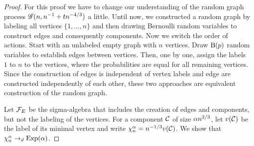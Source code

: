 \begin{proof}
	For this proof we have to change our understanding of the random graph process $\mathscr{G}(n, n^{-1} + tn^{-4/3})$ a little.
	Until now, we constructed a random graph by labeling all vertices $\{1, \dots, n\}$ 
	and then drawing Bernoulli random variables to construct edges and consequently components.
	Now we switch the order of actions. 
	Start with an unlabeled empty graph with $n$ vertices.
	Draw $\operatorname*{B}(p)$ random variables to establish edges between vertices.
	Then, one by one, assign the labels $1$ to $n$ to the vertices,
	where the probabilities are equal for all remaining vertices.
	Since the construction of edges is independent of vertex labels and edge are constructed independently of each other,
	these two approaches are equivalent construction of the random graph.
	
	Let $\mathcal{F}_E$ be the sigma-algebra that includes the creation of edges and components, 
	but not the labeling of the vertices.
	For a component $\mathcal{C}$ of size $\alpha n^{2 / 3}$,
	let $v(\mathcal{C})$ be the label of its minimal vertex and write 
	$\chi^\alpha_n = n^{-1 / 3}v(\mathcal{C})$.
	We show that $\chi^\alpha_n \rightarrow_d \operatorname*{Exp}(\alpha)$.
	

\end{proof}

